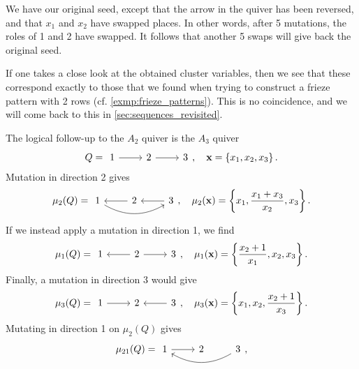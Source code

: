 \begin{example}
	We have our original seed, except that the arrow in the quiver has been reversed, and
	that $x_1$ and $x_2$ have swapped places. In other words, after 5 mutations, the roles
	of 1 and 2 have swapped. It follows that another 5 swaps will give back the original
	seed.

	If one takes a close look at the obtained cluster variables, then we see that these
	correspond exactly to those that we found when trying to construct a frieze pattern
	with 2 rows (cf. \cref{exmp:frieze_patterns}). This is no coincidence, and we will come
	back to this in \cref{sec:sequences_revisited}.
\end{example}

\begin{example}
	The logical follow-up to the $A_2$ quiver is the $A_3$ quiver
	\begin{equation*}
		Q =
		\begin{tikzcd}
			1 \rar[] & 2 \rar[] &3
		\end{tikzcd},
		\quad \bx = \left\{x_1, x_2, x_3\right\}.
	\end{equation*}
	Mutation in direction 2 gives
	\begin{equation*}
		\mu_2(Q) =
		\begin{tikzcd}
			1 \rar[leftarrow] \ar[rr, bend right] & 2 \rar[leftarrow]& 3
		\end{tikzcd},
		\quad \mu_2(\bx) = \left\{x_1, \frac{x_1 + x_3}{x_2}, x_3\right\}.
	\end{equation*}
	If we instead apply a mutation in direction 1, we find
	\begin{equation*}
		\mu_1(Q) =
		\begin{tikzcd}
			1 \rar[leftarrow] & 2 \rar[]& 3
		\end{tikzcd},
		\quad \mu_1(\bx) = \left\{\frac{x_2 + 1}{x_1}, x_2, x_3\right\}.
	\end{equation*}
	Finally, a mutation in direction 3 would give
	\begin{equation*}
		\mu_3(Q) =
		\begin{tikzcd}
			1 \rar[] & 2 \rar[leftarrow]& 3
		\end{tikzcd},
		\quad \mu_3(\bx) = \left\{x_1, x_2, \frac{x_2 + 1}{x_3}\right\}.
	\end{equation*}
	Mutating in direction 1 on $\mu_2(Q)$ gives
	\begin{equation*}
		\mu_{21}(Q) =
		\begin{tikzcd}
			1 \rar[] \ar[rr,leftarrow, bend right] & 2 & 3
		\end{tikzcd},

\end{equation*}
\end{example}
